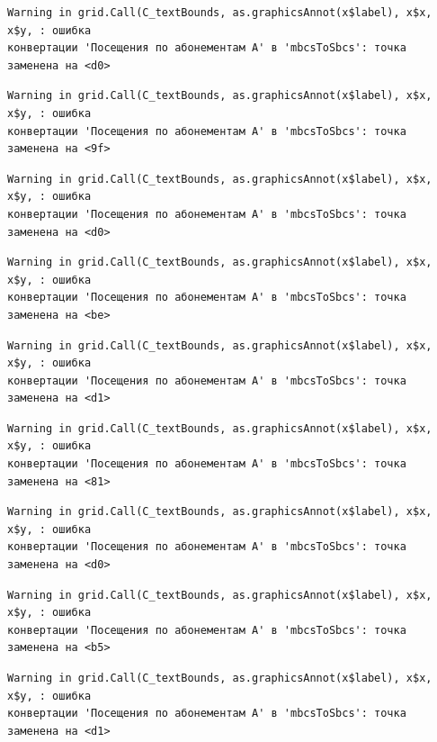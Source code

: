 \documentclass[
  letterpaper,
  DIV=11,
  numbers=noendperiod]{scrreprt}
\begin{document}
\begin{verbatim}
Warning in grid.Call(C_textBounds, as.graphicsAnnot(x$label), x$x, x$y, : ошибка
конвертации 'Посещения по абонементам А' в 'mbcsToSbcs': точка заменена на <d0>
\end{verbatim}

\begin{verbatim}
Warning in grid.Call(C_textBounds, as.graphicsAnnot(x$label), x$x, x$y, : ошибка
конвертации 'Посещения по абонементам А' в 'mbcsToSbcs': точка заменена на <9f>
\end{verbatim}

\begin{verbatim}
Warning in grid.Call(C_textBounds, as.graphicsAnnot(x$label), x$x, x$y, : ошибка
конвертации 'Посещения по абонементам А' в 'mbcsToSbcs': точка заменена на <d0>
\end{verbatim}

\begin{verbatim}
Warning in grid.Call(C_textBounds, as.graphicsAnnot(x$label), x$x, x$y, : ошибка
конвертации 'Посещения по абонементам А' в 'mbcsToSbcs': точка заменена на <be>
\end{verbatim}

\begin{verbatim}
Warning in grid.Call(C_textBounds, as.graphicsAnnot(x$label), x$x, x$y, : ошибка
конвертации 'Посещения по абонементам А' в 'mbcsToSbcs': точка заменена на <d1>
\end{verbatim}

\begin{verbatim}
Warning in grid.Call(C_textBounds, as.graphicsAnnot(x$label), x$x, x$y, : ошибка
конвертации 'Посещения по абонементам А' в 'mbcsToSbcs': точка заменена на <81>
\end{verbatim}

\begin{verbatim}
Warning in grid.Call(C_textBounds, as.graphicsAnnot(x$label), x$x, x$y, : ошибка
конвертации 'Посещения по абонементам А' в 'mbcsToSbcs': точка заменена на <d0>
\end{verbatim}

\begin{verbatim}
Warning in grid.Call(C_textBounds, as.graphicsAnnot(x$label), x$x, x$y, : ошибка
конвертации 'Посещения по абонементам А' в 'mbcsToSbcs': точка заменена на <b5>
\end{verbatim}

\begin{verbatim}
Warning in grid.Call(C_textBounds, as.graphicsAnnot(x$label), x$x, x$y, : ошибка
конвертации 'Посещения по абонементам А' в 'mbcsToSbcs': точка заменена на <d1>
\end{verbatim}
\end{document}
